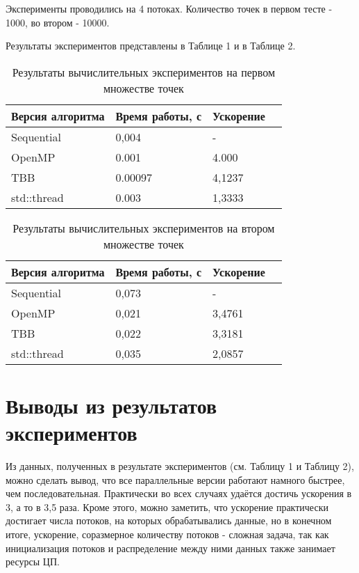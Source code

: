 \documentclass{report}
\begin{document}
\par Эксперименты проводились на 4 потоках. Количество точек в первом тесте - 1000, во втором - 10000.

\par Результаты экспериментов представлены в Таблице 1 и в Таблице 2.
\begin{table}[!h]
\caption{Результаты вычислительных экспериментов на первом множестве точек}
\centering
\begin{tabular}{| p{2cm} | p{3cm} | p{4cm} | p{2cm} |}
\hline
Версия алгоритма & Время работы, с & Ускорение  \\[5pt]
\hline
Sequential        & 0,004        & -         \\
OpenMP        & 0.001        & 4.000          \\
TBB       & 0.00097        & 4,1237         \\
std::thread        & 0.003        & 1,3333           \\

\hline
\end{tabular}
\end{table}

\begin{table}[!h]
\caption{Результаты вычислительных экспериментов на втором множестве точек}
\centering
\begin{tabular}{| p{2cm} | p{3cm} | p{4cm} | p{2cm} |}
\hline
Версия алгоритма & Время работы, с & Ускорение  \\[5pt]
\hline
Sequential      & 0,073       & -         \\
OpenMP        & 0,021        & 3,4761          \\
TBB       & 0,022       & 3,3181         \\
std::thread        & 0,035        & 2,0857          \\

\hline
\end{tabular}
\end{table}

\newpage

\section*{Выводы из результатов экспериментов}
Из данных, полученных в результате экспериментов (см. Таблицу 1 и Таблицу 2), можно сделать вывод, что все параллельные версии работают намного быстрее, чем последовательная. Практически во всех случаях удаётся достичь ускорения в 3, а то в 3,5 раза. Кроме этого, можно заметить, что ускорение практически достигает числа потоков, на которых обрабатывались данные, но в конечном итоге, ускорение, соразмерное количеству потоков - сложная задача, так как инициализация потоков и распределение между ними данных также занимает ресурсы ЦП. 
\newpage
\end{document}
